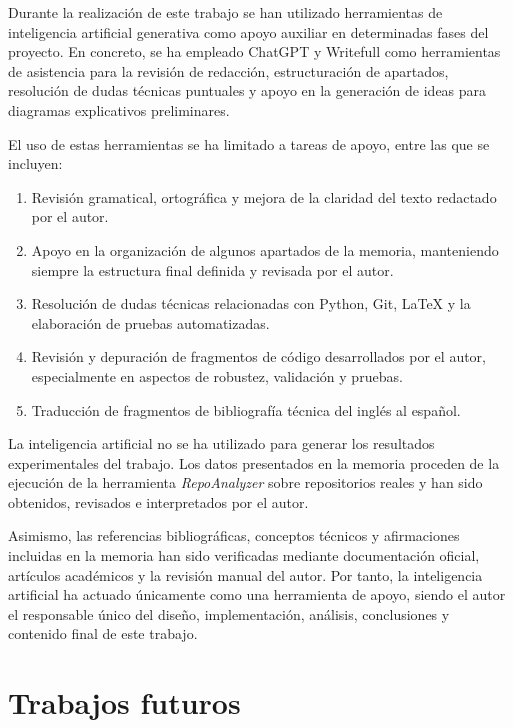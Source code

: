 \documentclass[a4paper, 12pt]{book}
\begin{document}
Durante la realización de este trabajo se han utilizado herramientas de inteligencia artificial generativa como apoyo auxiliar en determinadas fases del proyecto. En concreto, se ha empleado ChatGPT y Writefull como herramientas de asistencia para la revisión de redacción, estructuración de apartados, resolución de dudas técnicas puntuales y apoyo en la generación de ideas para diagramas explicativos preliminares.

El uso de estas herramientas se ha limitado a tareas de apoyo, entre las que se incluyen:

\begin{enumerate}
    \item Revisión gramatical, ortográfica y mejora de la claridad del texto redactado por el autor.
    
    \item Apoyo en la organización de algunos apartados de la memoria, manteniendo siempre la estructura final definida y revisada por el autor.
    
    \item Resolución de dudas técnicas relacionadas con Python, Git, LaTeX y la elaboración de pruebas automatizadas.
    
    \item Revisión y depuración de fragmentos de código desarrollados por el autor, especialmente en aspectos de robustez, validación y pruebas.

    \item Traducción de fragmentos de bibliografía técnica del inglés al español.
    
\end{enumerate}

La inteligencia artificial no se ha utilizado para generar los resultados experimentales del trabajo. Los datos presentados en la memoria proceden de la ejecución de la herramienta \emph{RepoAnalyzer} sobre repositorios reales y han sido obtenidos, revisados e interpretados por el autor.

Asimismo, las referencias bibliográficas, conceptos técnicos y afirmaciones incluidas en la memoria han sido verificadas mediante documentación oficial, artículos académicos y la revisión manual del autor. Por tanto, la inteligencia artificial ha actuado únicamente como una herramienta de apoyo, siendo el autor el responsable único del diseño, implementación, análisis, conclusiones y contenido final de este trabajo.


\section{Trabajos futuros}
\label{sec:trabajos_futuros}
\end{document}
